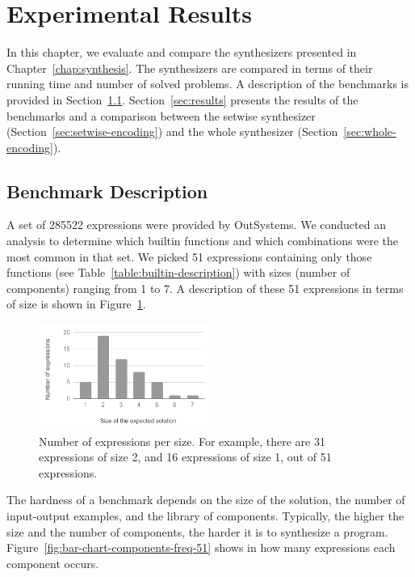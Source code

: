 \section{Experimental Results}
\label{sec:experimental-results}

In this chapter, we evaluate and compare the synthesizers presented in
Chapter~\ref{chap:synthesis}.
The synthesizers are compared in terms of their running time and number of
solved problems.
A description of the benchmarks is provided in Section~\ref{sec:bench-desc}.
Section~\ref{sec:results} presents the results of the benchmarks
and a comparison between the setwise synthesizer
(Section~\ref{sec:setwise-encoding}) and the whole synthesizer
(Section~\ref{sec:whole-encoding}).

\subsection{Benchmark Description}
\label{sec:bench-desc}

A set of 285522 expressions were provided by OutSystems.
We conducted an analysis to determine which builtin functions and which
combinations were the most common in that set.
We picked 51 expressions containing only those functions (see
Table~\ref{table:builtin-description}) with sizes (number of components) ranging
from 1 to 7.
A description of these 51 expressions in terms of size is shown in
Figure~\ref{fig:bar-chart-sizes-51}.

\begin{figure}
  \centering
  \includegraphics[width=0.5\textwidth]{assets/bar-chart-sizes-51.pdf}
  \caption{Number of expressions per size. For example, there are 31
    expressions of size 2, and 16 expressions of size 1, out of 51 expressions.}
  \label{fig:bar-chart-sizes-51}
\end{figure}

The hardness of a benchmark depends on the size of the solution, the number of
input-output examples, and the library of components.
Typically, the higher the size and the number of components, the harder it is to
synthesize a program.
Figure~\ref{fig:bar-chart-components-freq-51} shows in how many expressions each
component occurs.

